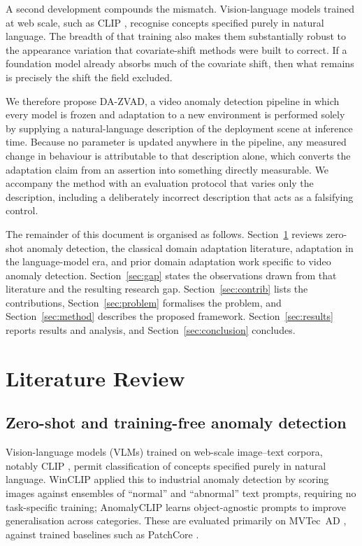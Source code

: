 \documentclass[a4paper,fleqn]{cas-sc}
\begin{document}
A second development compounds the mismatch. Vision-language models trained at
web scale, such as CLIP \citep{radford2021clip}, recognise concepts specified
purely in natural language. The breadth of that training also makes them
substantially robust to the appearance variation that covariate-shift methods
were built to correct. If a foundation model already absorbs much of the
covariate shift, then what remains is precisely the shift the field excluded.

We therefore propose DA-ZVAD, a video anomaly detection pipeline in which every
model is frozen and adaptation to a new environment is performed solely by
supplying a natural-language description of the deployment scene at inference
time. Because no parameter is updated anywhere in the pipeline, any measured
change in behaviour is attributable to that description alone, which converts
the adaptation claim from an assertion into something directly measurable. We
accompany the method with an evaluation protocol that varies only the
description, including a deliberately incorrect description that acts as a
falsifying control.

The remainder of this document is organised as follows.
Section~\ref{sec:lit} reviews zero-shot anomaly detection, the classical domain
adaptation literature, adaptation in the language-model era, and prior domain
adaptation work specific to video anomaly detection.
Section~\ref{sec:gap} states the observations drawn from that literature and the
resulting research gap. Section~\ref{sec:contrib} lists the contributions,
Section~\ref{sec:problem} formalises the problem, and
Section~\ref{sec:method} describes the proposed framework.
Section~\ref{sec:results} reports results and analysis, and
Section~\ref{sec:conclusion} concludes.

\section{Literature Review}
\label{sec:lit}

\subsection{Zero-shot and training-free anomaly detection}
Vision-language models (VLMs) trained on web-scale image--text corpora, notably
CLIP \citep{radford2021clip}, permit classification of concepts specified purely
in natural language. WinCLIP \citep{jeong2023winclip} applied this to industrial
anomaly detection by scoring images against ensembles of ``normal'' and
``abnormal'' text prompts, requiring no task-specific training; AnomalyCLIP
\citep{zhou2024anomalyclip} learns object-agnostic prompts to improve
generalisation across categories. These are evaluated primarily on MVTec~AD
\citep{bergmann2019mvtec}, against trained baselines such as PatchCore
\citep{roth2022patchcore}.
\end{document}
